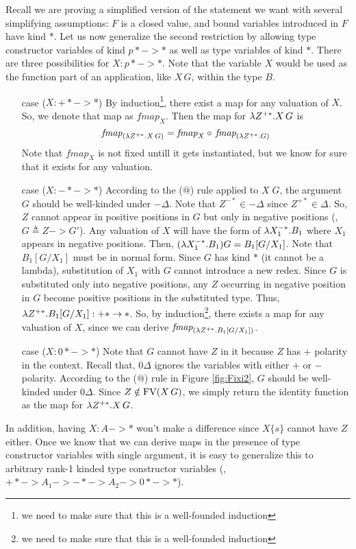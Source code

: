 Recall we are proving a simplified version of the statement we want with
several simplifying assumptions: $F$ is a closed value, and bound variables introduced
in $F$ have kind $*$. Let us now generalize the second restriction
by allowing type constructor variables of
kind $p* -> *$ as well as type variables of kind $*$. There are three
possibilities for $X:p* -> *$. Note that the variable
$X$ would be used as the function part of an application, like $X\,G$, within the type $B$.
\begin{itemize}
\item[case]($X : +* -> *$)
        By induction\footnote{
                we need to make sure that this is a well-founded induction},
        there exist a map for any valuation of $X$.
        So, we denote that map as $\textit{fmap}_{X}$.
        Then the map for $\lambda Z^{+*}.X\,G$ is
        \[ \textit{fmap}_{(\lambda Z^{+*}.X\,G)} =
                \textit{fmap}_{X} \circ\, \textit{fmap}_{(\lambda Z^{+*}.G)} \]
        Note that $\textit{fmap}_{X}$ is not fixed untill it gets
        instantiated, but we know for sure that it exists for any
        valuation.

\item[case]($X : -* -> *$)
        According to the ($@$) rule applied to $X\;G$, the argument $G$ should be well-kinded under $-\Delta$.
        Note that $Z^{-*}\in-\Delta$ since $Z^{+*}\in \Delta$.
        So, $Z$ cannot appear in positive positions in $G$ but only in
        negative positions (\eg, $G \triangleq Z -> G'$).
        Any valuation of $X$ will have the form of $\lambda X_1^{-*}.B_1$
        where $X_1$ appears in negative positions.
        Then, $(\lambda X_1^{-*}.B_1)G = B_1[G/X_1]$. Note that $B_1[G/X_1]$
        must be in normal form. Since $G$ has kind $*$ (it cannot be a lambda), substitution of $X_1$ with $G$
        cannot introduce a new redex. Since $G$ is substituted only into
        negative positions, any $Z$ occurring in negative position in $G$
        become positive positions in the substituted type. Thus, $\lambda Z^{+*}.B_1[G/X_1] : +* -> *$.
        So, by induction\footnote{
                we need to make sure that this is a well-founded induction},
        there exists a map for any valuation of $X$,
        since we can derive $\textit{fmap}_{(\lambda Z^{+*}.B_1[G/X_1])}$.

\item[case]($X : 0* -> *$)
        Note that $G$ cannot have $Z$ in it because $Z$ has $+$ polarity
        in the context. Recall that, $0\Delta$ ignores the variables
        with either $+$ or $-$ polarity. According to the ($@$) rule
        in Figure \ref{fig:Fixi2}, $G$ should be well-kinded under $0\Delta$.
        Since $Z\notin\mathop{\mathrm{FV}}(X\,G)$, we simply return the identity function
        as the map for $\lambda Z^{+*}.X\,G$.
\end{itemize}
In addition, having $X : A -> *$ won't make a difference since $X\{s\}$
cannot have $Z$ either. Once we know that we can derive maps in the presence
of type constructor variables with single argument, it is easy to generalize
this to arbitrary rank-1 kinded type constructor variables
(\eg, $+* -> A_1 -> -* -> A_2 -> 0* -> *$).



